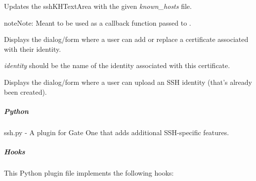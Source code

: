 \documentclass[letterpaper,10pt,openany]{sphinxmanual}
\begin{document}

\begin{fulllineitems}
\label{Applications/terminal/plugin_ssh:GateOne.SSH.updateKH}
Updates the sshKHTextArea with the given \emph{known\_hosts} file.

\begin{notice}{note}{Note:}
Meant to be used as a callback function passed to {\hyperref[Developer/js_gateone:GateOne.Utils.xhrGet]{}}.
\end{notice}

\end{fulllineitems}


\begin{fulllineitems}
\label{Applications/terminal/plugin_ssh:GateOne.SSH.uploadCertificateForm}
Displays the dialog/form where a user can add or replace a certificate associated with their identity.

\emph{identity} should be the name of the identity associated with this certificate.

\end{fulllineitems}


\begin{fulllineitems}
\label{Applications/terminal/plugin_ssh:GateOne.SSH.uploadIDForm}
Displays the dialog/form where a user can upload an SSH identity (that's already been created).

\end{fulllineitems}



\subparagraph{Python}
\label{Applications/terminal/plugin_ssh:python}\label{Applications/terminal/plugin_ssh:module-ssh}
ssh.py - A plugin for Gate One that adds additional SSH-specific features.


\subparagraph{Hooks}
\label{Applications/terminal/plugin_ssh:hooks}
This Python plugin file implements the following hooks:
\end{document}
